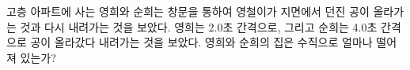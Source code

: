 \documentclass[floatfix,nofootinbib,superscriptaddress,fleqn,preprint]{revtex4}
\begin{document}




 고층 아파트에 사는 영희와 순희는 창문을 통하여 
영철이가 지면에서 던진 공이 올라가는 것과 다시 내려가는 것을 보았다. 
영희는 2.0초 간격으로, 그리고 순희는 4.0초 간격으로 공이 올라갔다 
내려가는 것을 보았다. 영희와 순희의 집은 수직으로 얼마나 떨어져 있는가?

\vspace{1cm}
\end{document}
